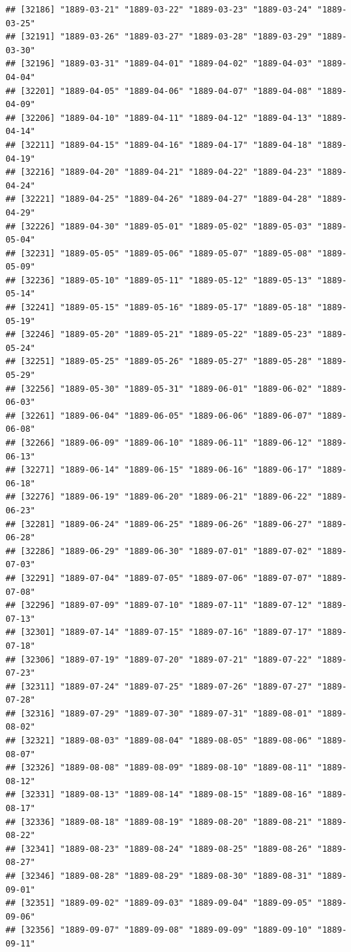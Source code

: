 \documentclass{article}\usepackage[]{graphicx}\usepackage[]{color}
\makeatletter
\newenvironment{kframe}{%
 \def\at@end@of@kframe{}%
 \ifinner\ifhmode%
  \def\at@end@of@kframe{\end{minipage}}%
  \begin{minipage}{\columnwidth}%
 \fi\fi%
 \def\FrameCommand##1{\hskip\@totalleftmargin \hskip-\fboxsep
 \colorbox{shadecolor}{##1}\hskip-\fboxsep
     \hskip-\linewidth \hskip-\@totalleftmargin \hskip\columnwidth}%
 \MakeFramed {\advance\hsize-\width
   \@totalleftmargin\z@ \linewidth\hsize
   \@setminipage}}%
 {\par\unskip\endMakeFramed%
 \at@end@of@kframe}
\newenvironment{knitrout}{}{} %
\makeatother
\begin{document}
\begin{description}
\begin{knitrout}
\begin{kframe}
\begin{verbatim}
## [32186] "1889-03-21" "1889-03-22" "1889-03-23" "1889-03-24" "1889-03-25"
## [32191] "1889-03-26" "1889-03-27" "1889-03-28" "1889-03-29" "1889-03-30"
## [32196] "1889-03-31" "1889-04-01" "1889-04-02" "1889-04-03" "1889-04-04"
## [32201] "1889-04-05" "1889-04-06" "1889-04-07" "1889-04-08" "1889-04-09"
## [32206] "1889-04-10" "1889-04-11" "1889-04-12" "1889-04-13" "1889-04-14"
## [32211] "1889-04-15" "1889-04-16" "1889-04-17" "1889-04-18" "1889-04-19"
## [32216] "1889-04-20" "1889-04-21" "1889-04-22" "1889-04-23" "1889-04-24"
## [32221] "1889-04-25" "1889-04-26" "1889-04-27" "1889-04-28" "1889-04-29"
## [32226] "1889-04-30" "1889-05-01" "1889-05-02" "1889-05-03" "1889-05-04"
## [32231] "1889-05-05" "1889-05-06" "1889-05-07" "1889-05-08" "1889-05-09"
## [32236] "1889-05-10" "1889-05-11" "1889-05-12" "1889-05-13" "1889-05-14"
## [32241] "1889-05-15" "1889-05-16" "1889-05-17" "1889-05-18" "1889-05-19"
## [32246] "1889-05-20" "1889-05-21" "1889-05-22" "1889-05-23" "1889-05-24"
## [32251] "1889-05-25" "1889-05-26" "1889-05-27" "1889-05-28" "1889-05-29"
## [32256] "1889-05-30" "1889-05-31" "1889-06-01" "1889-06-02" "1889-06-03"
## [32261] "1889-06-04" "1889-06-05" "1889-06-06" "1889-06-07" "1889-06-08"
## [32266] "1889-06-09" "1889-06-10" "1889-06-11" "1889-06-12" "1889-06-13"
## [32271] "1889-06-14" "1889-06-15" "1889-06-16" "1889-06-17" "1889-06-18"
## [32276] "1889-06-19" "1889-06-20" "1889-06-21" "1889-06-22" "1889-06-23"
## [32281] "1889-06-24" "1889-06-25" "1889-06-26" "1889-06-27" "1889-06-28"
## [32286] "1889-06-29" "1889-06-30" "1889-07-01" "1889-07-02" "1889-07-03"
## [32291] "1889-07-04" "1889-07-05" "1889-07-06" "1889-07-07" "1889-07-08"
## [32296] "1889-07-09" "1889-07-10" "1889-07-11" "1889-07-12" "1889-07-13"
## [32301] "1889-07-14" "1889-07-15" "1889-07-16" "1889-07-17" "1889-07-18"
## [32306] "1889-07-19" "1889-07-20" "1889-07-21" "1889-07-22" "1889-07-23"
## [32311] "1889-07-24" "1889-07-25" "1889-07-26" "1889-07-27" "1889-07-28"
## [32316] "1889-07-29" "1889-07-30" "1889-07-31" "1889-08-01" "1889-08-02"
## [32321] "1889-08-03" "1889-08-04" "1889-08-05" "1889-08-06" "1889-08-07"
## [32326] "1889-08-08" "1889-08-09" "1889-08-10" "1889-08-11" "1889-08-12"
## [32331] "1889-08-13" "1889-08-14" "1889-08-15" "1889-08-16" "1889-08-17"
## [32336] "1889-08-18" "1889-08-19" "1889-08-20" "1889-08-21" "1889-08-22"
## [32341] "1889-08-23" "1889-08-24" "1889-08-25" "1889-08-26" "1889-08-27"
## [32346] "1889-08-28" "1889-08-29" "1889-08-30" "1889-08-31" "1889-09-01"
## [32351] "1889-09-02" "1889-09-03" "1889-09-04" "1889-09-05" "1889-09-06"
## [32356] "1889-09-07" "1889-09-08" "1889-09-09" "1889-09-10" "1889-09-11"

\end{verbatim}
\end{kframe}
\end{knitrout}
\end{description}
\end{document}
